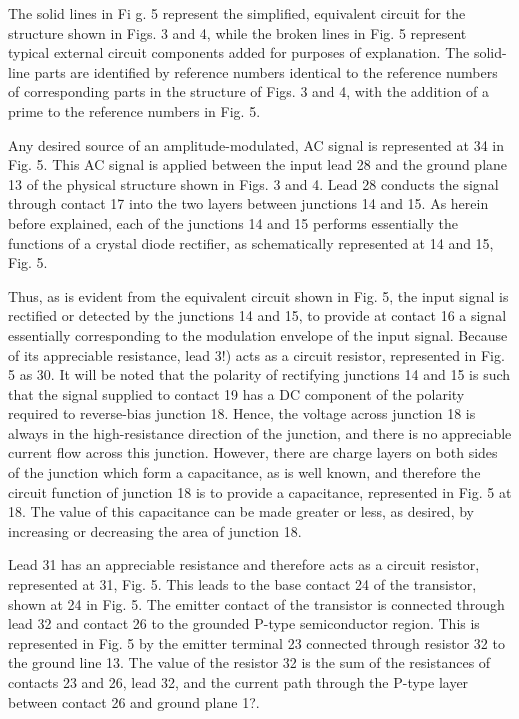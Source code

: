 The solid lines in Fi g. 5 represent the simplified, equivalent circuit for the structure shown in Figs. 3 and 4, while the broken lines in Fig. 5 represent typical external circuit components added for purposes of explanation. The solid-line parts are identified by reference numbers identical to the reference numbers of corresponding parts in the structure of Figs. 3 and 4, with the addition of a prime to the reference numbers in Fig. 5.

Any desired source of an amplitude-modulated, AC signal is represented at 34 in Fig. 5. This AC signal is applied between the input lead 28 and the ground plane 13 of the physical structure shown in Figs. 3 and 4. Lead 28 conducts the signal through contact 17 into the two layers between junctions 14 and 15. As herein before explained, each of the junctions 14 and 15 performs essentially the functions of a crystal diode rectifier, as schematically represented at 14 and 15, Fig. 5.

Thus, as is evident from the equivalent circuit shown in Fig. 5, the input signal is rectified or detected by the junctions 14 and 15, to provide at contact 16 a signal essentially corresponding to the modulation envelope of the input signal. Because of its appreciable resistance, lead 3!) acts as a circuit resistor, represented in Fig. 5 as 30. It will be noted that the polarity of rectifying junctions 14 and 15 is such that the signal supplied to contact 19 has a DC component of the polarity required to reverse-bias junction 18. Hence, the voltage across junction 18 is always in the high-resistance direction of the junction, and there is no appreciable current flow across this junction. However, there are charge layers on both sides of the junction which form a capacitance, as is well known, and therefore the circuit function of junction 18 is to provide a capacitance, represented in Fig. 5 at 18. The value of this capacitance can be made greater or less, as desired, by increasing or decreasing the area of junction 18.

Lead 31 has an appreciable resistance and therefore acts as a circuit resistor, represented at 31, Fig. 5. This leads to the base contact 24 of the transistor, shown at 24 in Fig. 5. The emitter contact of the transistor is connected through lead 32 and contact 26 to the grounded P-type semiconductor region. This is represented in Fig. 5 by the emitter terminal 23 connected through resistor 32 to the ground line 13. The value of the resistor 32 is the sum of the resistances of contacts 23 and 26, lead 32, and the current path through the P-type layer between contact 26 and ground plane 1?.


